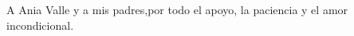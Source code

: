 \begin{dedication}
    A Ania Valle y a mis padres,\newline por todo el apoyo, la paciencia y el amor incondicional.
\end{dedication}